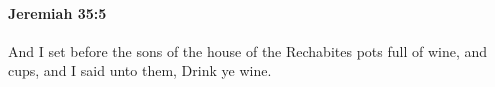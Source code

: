 
		\paragraph{Jeremiah 35:5} %
			\label{JEREMIAH-35-5}

			And I set before the sons of the house of the Rechabites pots full of wine, and cups, and I said unto them, Drink ye wine.


